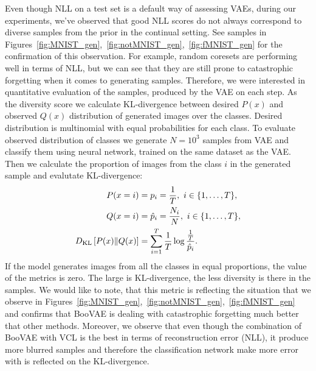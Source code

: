 Even though NLL on a test set is a default way of assessing VAEs, during our experiments, we've observed that good NLL scores do not always correspond to diverse samples from the prior in the continual setting. See samples in Figures~\ref{fig:MNIST_gen},~\ref{fig:notMNIST_gen},~\ref{fig:fMNIST_gen} for the confirmation of this observation. For example, random coresets are performing well in terms of NLL, but we can see that they are still prone to catastrophic forgetting when it comes to generating samples. 
Therefore, we were interested in quantitative evaluation of the samples, produced by the VAE on each step. As the diversity score we calculate KL-divergence between desired $P(x)$ and observed $Q(x)$ distribution of generated images over the classes. Desired distribution is multinomial with equal probabilities for each class. To evaluate observed distribution of classes we generate $N = 10^3$ samples from VAE and classify them using neural network, trained on the same dataset as the VAE. Then we calculate the proportion of images from the class $i$ in the generated sample and evalutate KL-divergence:
\begin{equation}
\begin{aligned}
\setlength{\abovedisplayskip}{1pt}
\setlength{\belowdisplayskip}{1pt}
P(x=i) &= p_i = \frac{1}{T}, \,\, i \in \{1, \dots, T\}, \\
Q(x=i) &= \hat{p}_i = \frac{N_i}{N}, \,\, i \in \{1, \dots, T\},\\
\KL{P(x)}{Q(x)} &= \sum_{i=1}^T \frac{1}{T} \log\frac{\frac{1}{T}}{\hat{p}_i}.
\end{aligned}
\end{equation}
If the model generates images from all the classes in equal proportions, the value of the metrics is zero. The large is KL-divergence, the less diversity is there in the samples. We would like to note, that this metric is reflecting the situation that we observe in Figures~\ref{fig:MNIST_gen},~\ref{fig:notMNIST_gen},~\ref{fig:fMNIST_gen} and confirms that BooVAE is dealing with catastrophic forgetting much better that other methods. Moreover, we observe that even though the combination of BooVAE with VCL is the best in terms of reconstruction error (NLL), it produce more blurred samples and therefore the classification network make more error with is reflected on the KL-divergence.

\newpage
